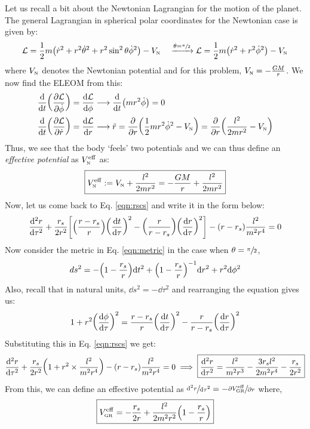 Let us recall a bit about the Newtonian Lagrangian for the motion of the planet. The general Lagrangian in spherical polar coordinates for the Newtonian case is given by:
$$\mathcal L = \frac{1}{2}m\qty(\dot{r}^2+ r^2\dot{\theta}^2+ r^2\sin^2\theta \dot{\phi}^2)- V_{\text{\tiny N}} \quad \xrightarrow{\theta = \sfrac{\pi}{2}} \mathcal L =  \frac{1}{2}m\qty(\dot{r}^2+ r^2 \dot{\phi}^2)-V_{\text{\tiny N}}$$
where $V_{\text{\tiny N}}$ denotes the Newtonian potential and for this problem, $V_{\text{\tiny N}} = -\frac{GM}{r}$. We now find the ELEOM from this:
\begin{align*}
    &\dv{t}\qty(\pdv{\mathcal L}{\dot{\phi}}) = \dv{\mathcal L}{\phi} \longrightarrow \dv{t}\qty(mr^2\dot{\phi}) = 0\\
    &\dv{t}\qty(\pdv{\mathcal L}{\dot{r}}) = \dv{\mathcal L}{r} \longrightarrow \ddot{r} = \pdv{r}\qty(\frac{1}{2}mr^2\dot{\phi}^2 -V_{\text{\tiny N}}) = \pdv{r}\qty(\frac{l^2}{2mr^2} - V_{\text{\tiny N}} )
\end{align*}
Thus, we see that the body `feels' two potentials and we can thus define an \textit{effective potential} as $V^{\mathrm{eff}}_{\text{\tiny N}}$ as:
\begin{align}
    \boxed{V^{\mathrm{eff}}_{\text{\tiny N}} := V_{\text{\tiny N}} + \frac{l^2}{2mr^2} = -\frac{GM}{r} + \frac{l^2}{2mr^2}}\label{eqn:veffn}
\end{align}
Now, let us come back to Eq. \ref{eqn:rscs} and write it in the form below:
\begin{align}
    \dv[2]{r}{\tau} + \frac{r_s}{2r^2} \qty[\qty(\frac{r-r_s}{r}) \qty(\dv{t}{\tau})^2 - \qty(\frac{r}{r-r_s}) \qty(\dv{r}{\tau})^2] - (r-r_s)\frac{l^2}{m^2r^4} =0
\end{align}
Now consider the metric in Eq. \ref{eqn:metric} in the case when $\theta=\sfrac{\pi}{2}$,
$$ds^2 = -\qty(1- \frac{r_s}{r})\dd t^2 + \qty(1- \frac{r_s}{r})^{-1} \dd r^2 +r^2 \dd \phi^2$$
Also, recall that in natural units, $\dd s^2 = -\dd \tau^2$ and rearranging the equation gives us:
$$1+ r^2 \qty(\dv{\phi}{\tau})^2 = \frac{r- r_s}{r}\qty(\dv{t}{\tau})^2 - \frac{r}{r-r_s}\qty(\dv{r}{\tau})^2$$
Substituting this in Eq. \ref{eqn:rscs} we get:
$$\dv[2]{r}{\tau}+ \frac{r_s}{2r^2}\qty(1+r^2 \times \frac{l^2}{m^2r^4})-(r-r_s)\frac{l^2}{m^2r^4} =0\implies \boxed{\dv[2]{r}{\tau} = \frac{l^2}{m^2r^3} - \frac{3r_sl^2}{2m^2r^4} - \frac{r_s}{2r^2}}$$
From this, we can define an effective potential as $\sfrac{\dd^2 r}{\dd \tau^2} = - \sfrac{\partial V^{\mathrm{eff}}_{\text{\tiny GR}}}{\partial r}$ where, 
\begin{align}\label{eqn:veffgr}
    \boxed{{V^{\mathrm{eff}}_{\text{\tiny GR}}} = -\frac{r_s}{2r} + \frac{l^2}{2m^2 r^2} \qty(1 - \frac{r_s}{r})}
\end{align}
